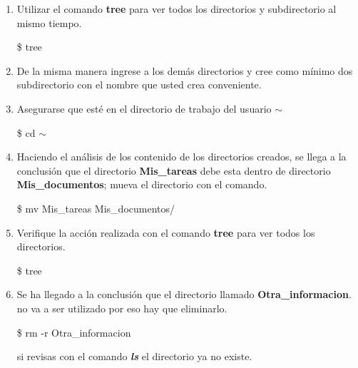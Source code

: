 \documentclass[a4paper,12pt,spanish]{article}
\begin{document}
\begin{enumerate}
  \item Utilizar el comando \textbf{tree} para ver todos los
  directorios y subdirectorio al mismo tiempo.
 \begin{tcolorbox}[colback=gray!5]
    \$ tree
   \end{tcolorbox}

   
   \item De la misma manera ingrese a los demás directorios y cree
   como mínimo dos subdirectorio con el nombre que usted crea
   conveniente.\\


 \begin{shadedbox}
   \textcolor{white}{{\large {}}}
   \end{shadedbox}

 

  \item Asegurarse que esté en el directorio de trabajo del  usuario  {\Large $\sim$} 
  \begin{tcolorbox}[colback=gray!5]
   \$ cd $\sim$
 \end{tcolorbox}

  \item Haciendo el análisis de los contenido de los directorios
  creados, se llega a la conclusión que el directorio  \textbf{Mis\_tareas} debe esta dentro de directorio
  \textbf{Mis\_documentos}; mueva el directorio con el comando.
  
  \begin{tcolorbox}[colback=gray!5]
    \$ mv  Mis\_tareas  Mis\_documentos/
  \end{tcolorbox}


   \item Verifique la acción realizada con  el comando \textbf{tree} para ver todos los directorios.
 \begin{tcolorbox}[colback=gray!5]
    \$ tree
   \end{tcolorbox}
   \item Se ha llegado a la conclusión que el  directorio llamado
   \textbf{Otra\_informacion}. no va a ser utilizado por eso hay que eliminarlo.
 \begin{tcolorbox}[colback=gray!5]
    \$ rm -r Otra\_informacion
   \end{tcolorbox}

   si revisas con el comando \textbf{{\it ls}} el directorio ya no existe.


\end{enumerate}
\end{document}
